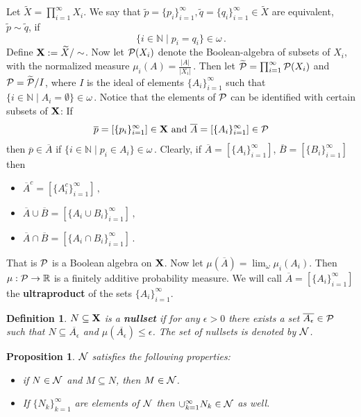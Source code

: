 \documentclass [11pt] {article}
\newtheorem{proposition}{Proposition}[section]
\newtheorem{definition}{Definition}[section]
\def\o{\omega}
\def\e{\epsilon}
\def\bR{{\mathbb R}}
\def\bN{{\mathbb N}}\def\bQ{{\mathbb Q}}
\def\cP{\mbox{$\cal P$}}
\def\cN{\mbox{$\cal N$}}
\def\to{\rightarrow}
\def\xo{{\bf X}}
\def\muo{\mu}
\begin{document}
\noindent
Let $\widetilde{X}=\prod^\infty_{i=1}X_i$. We say that
$\widetilde{p}=\{p_i\}^\infty_{i=1}, \widetilde{q}=\{q_i\}^\infty_{i=1}\in
\widetilde{X}$ are equivalent,
$\widetilde{p}\sim\widetilde{q}$, if
$$\{i\in \bN\mid p_i=q_i\}\in \omega\,.$$
Define $\xo:=\widetilde{X}/\sim$.
Now let $\cP(X_i)$ denote the Boolean-algebra of subsets of $X_i$, with the
normalized measure $\mu_i(A)=\frac{|A|}{|X_i|}\,.$
Then let $\widetilde{\cP}=\prod^\infty_{i=1}\cP(X_i)$ and
$\cP=\widetilde{\cP}/I$, where $I$ is the ideal of elements
$\{A_i\}^\infty_{i=1}$
such that
$\{i\in \bN\mid A_i=\emptyset\}\in \omega\,.$
Notice that the elements of $\cP$ can be identified with certain subsets
of $\xo$: If
$$\overline{p}=[\{p_i\}^\infty_{i=1}]\in \xo\,\,\mbox{and}\,\, \overline{A}=
[\{A_i\}^\infty_{i=1}]\in \cP$$
then $\overline{p}\in \overline{A}$ if
$\{i\in \bN\mid p_i\in A_i\}\in \omega\,.$
Clearly, if $\overline{A}=
[\{A_i\}^\infty_{i=1}]$, $\overline{B}=
[\{B_i\}^\infty_{i=1}]$ then
\begin{itemize}
\item
$\overline{A}^c=[\{A^c_i\}^\infty_{i=1}]\,,$
\item
$\overline{A}\cup \overline{B}=[\{A_i\cup B_i\}^\infty_{i=1}]\,,$
\item
$\overline{A}\cap \overline{B}=[\{A_i\cap B_i\}^\infty_{i=1}]\,.$
\end{itemize}
That is $\cP$ is a Boolean algebra on $\xo$.
Now let $\muo(\overline{A})=\lim_{\o} \mu_i(A_i)$. Then $\muo:\cP\to\bR$ is
a finitely additive probability measure. We will call $\overline{A}=
[\{A_i\}^\infty_{i=1}]$ the {\bf ultraproduct} of the sets
$\{A_i\}^\infty_{i=1}$.
\begin{definition}
$N\subseteq \xo$ is a {\bf nullset} if for any $\e>0$ there exists
a set $\overline{A_\e}\in\cP$ such that $N\subseteq \overline{A_\e}$
and $\muo(\overline{A_\e})\leq \e$. The set of nullsets is denoted
by $\cN$.
\end{definition}
\begin{proposition}
$\cN$ satisfies the following properties:
\begin{itemize}
\item if $N\in \cN$ and $M\subseteq N$, then $M\in \cN$.
\item If $\{N_k\}^\infty_{k=1}$ are elements of $\cN$ then
$\cup^\infty_{k=1} N_k\in \cN$ as well.
\end{itemize} \end{proposition}
\end{document}
